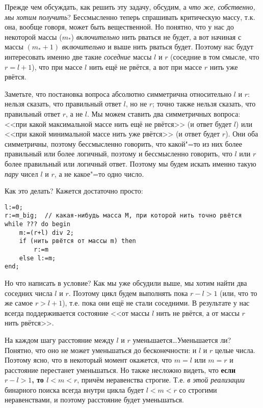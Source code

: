 Прежде чем обсуждать, как решить эту задачу, обсудим, а \textit{что же, собственно, мы хотим получить}? 
Бессмысленно теперь спрашивать критическую массу, т.к. она, вообще говоря, может быть вещественной.
Но понятно, что у нас до некоторой массы ($m_*$) \textit{включительно} нить рваться не будет, а вот начиная с массы
$(m_*+1)$ \textit{включительно} и выше нить рваться будет. 
Поэтому нас будут интересовать именно две такие \textit{соседние} массы $l$ и $r$ (соседние в том смысле, 
что $r=l+1$), что при массе $l$ нить ещё не рвётся,
а вот при массе $r$ нить уже рвётся.

Заметьте, что постановка вопроса абсолютно симметрична относительно $l$ и $r$: нельзя сказать, что правильный ответ $l$, но не $r$; 
точно также нельзя сказать, что правильный ответ $r$, а не $l$. 
Мы можем ставить два симметричных вопроса: <<при какой максимальной массе нить ещё не рвётся>> (и ответ будет $l$)
или <<при какой минимальной массе нить уже рвётся>> (и ответ будет $r$).
Они оба симметричны, поэтому бессмысленно говорить, что какой"=то из них более правильный или более логичный, поэтому
и бессмысленно говорить, что $l$ или $r$ более правильный или логичный ответ. 
Поэтому мы будем искать именно такую \textit{пару} чисел $l$ и $r$, а не какое"=то одно число.

Как это делать? Кажется достаточно просто:
\begin{codesampleo}\begin{verbatim}
l:=0;
r:=m_big;  // какая-нибудь масса M, при которой нить точно рвётся
while ??? do begin    
    m:=(r+l) div 2;
    if (нить рвётся от массы m) then
        r:=m
    else l:=m;
end;
\end{verbatim}
\end{codesampleo}
Но что написать в условие? 
Как мы уже обсудили выше, мы хотим найти два соседних числа $l$ и $r$. 
Поэтому цикл будем выполнять пока $r-l>1$ (или, что то же самое $r>l+1$), т.е. пока они ещё не стали соседними.
В результате у нас всегда поддерживается состояние <<от массы $l$ нить не рвётся, а от массы $r$ нить рвётся>>.

На каждом шагу расстояние между $l$ и $r$ уменьшается\dots Уменьшается ли?
Понятно, что оно не может уменьшаться до бесконечности: и $l$ и $r$ целые числа.
Поэтому ясно, что в некоторый момент окажется, что $m=l$ или $m=r$ и расстояние перестанет уменьшаться.
Но также несложно видеть, что \textbf{если $r-l>1$, то $l<m<r$}, причём неравенства строгие. 
Т.е. \textit{в этой реализации} бинарного поиска всегда внутри цикла будет $l<m<r$ со строгими неравенствами,
и поэтому расстояние будет уменьшаться.

